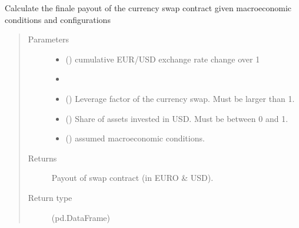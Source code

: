 \documentclass[a4paper,11pt,english]{sphinxmanual}
\begin{document}
\begin{fulllineitems}
\label{\detokenize{simulation_analysis:src.simulation_analysis.task_swap_payout.calc_final_payout}}
\sphinxAtStartPar
Calculate the finale payout of the currency swap contract given macroeconomic conditions
and configurations
\begin{quote}\begin{description}
\item[{Parameters}] \leavevmode\begin{itemize}
\item {} 
\sphinxAtStartPar
{} () \textendash{} cumulative EUR/USD exchange rate change over 1

\item {} 
\sphinxAtStartPar
{} \textendash{} 

\item {} 
\sphinxAtStartPar
{} () \textendash{} Leverage factor of the currency swap. Must be larger than 1.

\item {} 
\sphinxAtStartPar
{} () \textendash{} Share of assets invested in USD. Must be between 0 and 1.

\item {} 
\sphinxAtStartPar
{} () \textendash{} assumed macroeconomic conditions.

\end{itemize}

\item[{Returns}] \leavevmode
\sphinxAtStartPar
Payout of swap contract (in EURO \& USD).

\item[{Return type}] \leavevmode
\sphinxAtStartPar
(pd.DataFrame)

\end{description}\end{quote}

\end{fulllineitems}
\end{document}

